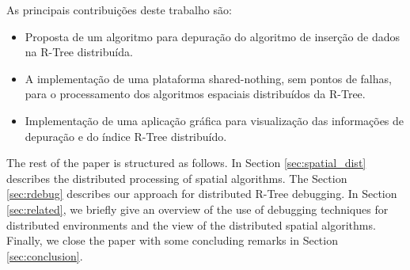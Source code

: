 As principais contribuições deste trabalho são:

\begin{itemize}
  \item Proposta de um algoritmo para depuração do algoritmo de inserção de dados na R-Tree distribuída.
	\item A implementação de uma plataforma shared-nothing, sem pontos de falhas, para o processamento dos algoritmos espaciais distribuídos da R-Tree.
	\item Implementação de uma aplicação gráfica para visualização das informações de depuração e do índice R-Tree distribuído.
\end{itemize}

The rest of the paper is structured as follows. In Section \ref{sec:spatial_dist} describes the distributed processing of spatial algorithms. The Section \ref{sec:rdebug} describes our approach for distributed R-Tree debugging. In Section \ref{sec:related}, we briefly give an overview of the use of debugging techniques for distributed environments and the view of the distributed spatial algorithms. Finally, we close the paper with some concluding remarks in Section \ref{sec:conclusion}.